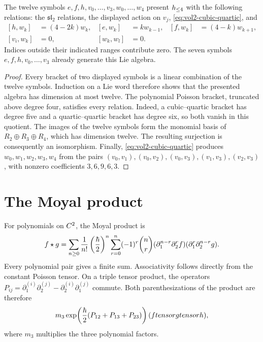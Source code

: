 \begin{theorem}
The twelve symbols $e,f,h,v_0,\ldots,v_3,w_0,\ldots,w_4$ present
$h_{\le4}$ with the following relations: the $\mathfrak{sl}_2$
relations, the displayed action on $v_j$,
\eqref{eq:vol2-cubic-quartic}, and
\[
\begin{aligned}
 [h,w_k]&=(4-2k)w_k,&[e,w_k]&=kw_{k-1},&
 [f,w_k]&=(4-k)w_{k+1},\\
 [v_i,w_k]&=0,&[w_k,w_l]&=0.
\end{aligned}
\]
Indices outside their indicated ranges contribute zero.
The seven symbols $e,f,h,v_0,\ldots,v_3$ already generate this Lie algebra.
\end{theorem}
\begin{proof}
Every bracket of two displayed symbols is a linear combination of the
twelve symbols.  Induction on a Lie word therefore shows that the
presented algebra has dimension at most twelve.
The polynomial Poisson bracket, truncated above degree four, satisfies
every relation.  Indeed, a cubic--quartic bracket has degree five and a
quartic--quartic bracket has degree six, so both vanish in this quotient.
The images of the twelve symbols form the monomial basis of
$R_2\oplus R_3\oplus R_4$, which has dimension twelve.
The resulting surjection is consequently an isomorphism.
Finally, \eqref{eq:vol2-cubic-quartic} produces $w_0,w_1,w_2,w_3,w_4$
from the pairs $(v_0,v_1),(v_0,v_2),(v_0,v_3),(v_1,v_3),(v_2,v_3)$,
with nonzero coefficients $3,6,9,6,3$.
\end{proof}

\section{The Moyal product}
For polynomials on $C^2$, the Moyal product is
\begin{equation}\label{eq:vol2-moyal}
 f\star g
 =\sum_{n\ge0}\frac1{n!}\left(\frac{\hbar}{2}\right)^n
 \sum_{r=0}^n(-1)^r\binom nr
 (\partial_1^{n-r}\partial_2^rf)
 (\partial_1^r\partial_2^{n-r}g).
\end{equation}
Every polynomial pair gives a finite sum.
Associativity follows directly from the constant Poisson tensor.
On a triple tensor product, the operators
$P_{ij}=\partial_1^{(i)}\partial_2^{(j)}-
\partial_2^{(i)}\partial_1^{(j)}$ commute.  Both parenthesizations
of the product are therefore
\[
 m_3\exp\!\left(\frac{\hbar}{2}
                   (P_{12}+P_{13}+P_{23})\right)
        (ftensor gtensor h),
\]
where $m_3$ multiplies the three polynomial factors.

